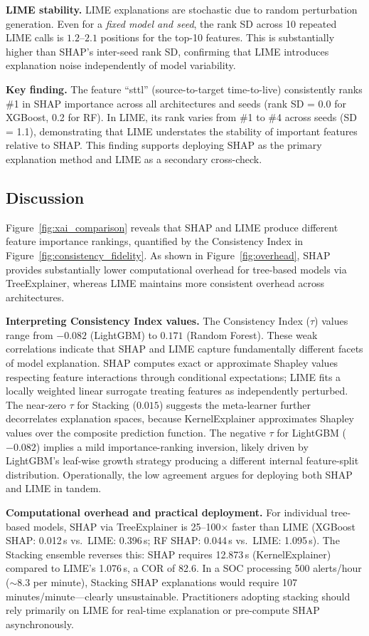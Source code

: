 \documentclass[conference]{IEEEtran}
\begin{document}
\textbf{LIME stability.} LIME explanations are stochastic due to random perturbation generation. Even for a \textit{fixed model and seed}, the rank SD across 10 repeated LIME calls is $1.2$--$2.1$ positions for the top-10 features. This is substantially higher than SHAP's inter-seed rank SD, confirming that LIME introduces explanation noise independently of model variability.

\textbf{Key finding.} The feature ``sttl'' (source-to-target time-to-live) consistently ranks \#1 in SHAP importance across all architectures and seeds (rank SD = 0.0 for XGBoost, 0.2 for RF). In LIME, its rank varies from \#1 to \#4 across seeds (SD = 1.1), demonstrating that LIME understates the stability of important features relative to SHAP. This finding supports deploying SHAP as the primary explanation method and LIME as a secondary cross-check.

\subsection{Discussion}

Figure~\ref{fig:xai_comparison} reveals that SHAP and LIME produce different feature importance rankings, quantified by the Consistency Index in Figure~\ref{fig:consistency_fidelity}. As shown in Figure~\ref{fig:overhead}, SHAP provides substantially lower computational overhead for tree-based models via TreeExplainer, whereas LIME maintains more consistent overhead across architectures.

\textbf{Interpreting Consistency Index values.}
The Consistency Index ($\tau$) values range from $-0.082$ (LightGBM) to $0.171$ (Random Forest). These weak correlations indicate that SHAP and LIME capture fundamentally different facets of model explanation. SHAP computes exact or approximate Shapley values respecting feature interactions through conditional expectations; LIME fits a locally weighted linear surrogate treating features as independently perturbed. The near-zero $\tau$ for Stacking ($0.015$) suggests the meta-learner further decorrelates explanation spaces, because KernelExplainer approximates Shapley values over the composite prediction function. The negative $\tau$ for LightGBM ($-0.082$) implies a mild importance-ranking inversion, likely driven by LightGBM's leaf-wise growth strategy producing a different internal feature-split distribution. Operationally, the low agreement argues for deploying both SHAP and LIME in tandem.

\textbf{Computational overhead and practical deployment.}
For individual tree-based models, SHAP via TreeExplainer is 25--100$\times$ faster than LIME (XGBoost SHAP: 0.012\,s vs.\ LIME: 0.396\,s; RF SHAP: 0.044\,s vs.\ LIME: 1.095\,s). The Stacking ensemble reverses this: SHAP requires 12.873\,s (KernelExplainer) compared to LIME's 1.076\,s, a COR of 82.6. In a SOC processing 500 alerts/hour ($\sim$8.3 per minute), Stacking SHAP explanations would require 107\,minutes/minute---clearly unsustainable. Practitioners adopting stacking should rely primarily on LIME for real-time explanation or pre-compute SHAP asynchronously.
\end{document}
